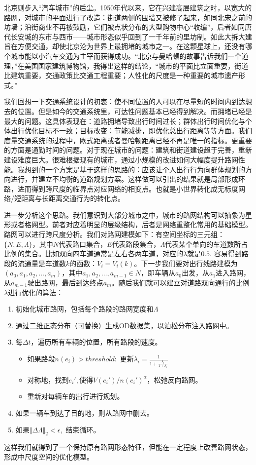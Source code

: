 北京则步入“汽车城市”的后尘。1950年代以来，它在兴建高层建筑之时，以宽大的路网，对城市的平面进行了改造：街道两侧的围墙又被修了起来，如同北宋之前的坊墙；沿街商业不再被鼓励，它们被点状分布的大型购物中心“收编”，后者如同唐代长安城的东市与西市——城市形态似乎回到了一千年前的里坊制。如此大拆大建旨在方便交通，却使北京沦为世界上最拥堵的城市之一。在这颗星球上，还没有哪个城市能以小汽车交通为主宰而获得成功。“北京与曼哈顿的故事告诉我们一个道理，”在美国国家建筑博物馆，我得出这样的结论，“城市的平面比立面重要，街道比建筑重要，交通政策比交通工程重要；人性化的尺度是一种重要的城市遗产形式。” 

我们回想一下交通系统设计的初衷：使不同位置的人可以在尽量短的时间内到达想去的位置。但是如今的交通系统里，可达性问题基本已经得到解决。而拥堵已经是最大的问题。这具体表现在：道路拥堵导致出行时间过长；群体出行时间优化与个体出行优化目标不一致；目标改变：节能减排，即优化总出行距离等等方面。我们度量交通系统的过程中，欧式距离或者曼哈顿距离已经不再是唯一的指标。更重要的方面是通勤时间的问题。对于现在城市的问题：建筑和街道建设趋于完善，重新建设难度巨大。很难根据现有的城市，通过小规模的改进如何大幅度提升路网性能。我想到的一个方案是基于这样的思路的：应该让个人出行行为向群体规划的方向进行，并建立不均衡的道路规划方案。这样做可以引出的结果就是局部形成环路，进而得到跨尺度的临界点对应网络的相变点。也就是小世界转化成无标度网络/短距离与长距离交通行为的转化点。

进一步分析这个思路。我们意识到大部分城市之中，城市的路网结构可以抽象为星形或者格网型。前者对应着明显的层级结构，后者是网络重整化常用的基础模型。路网可以进行跨尺度分析。我们对路网建模如下：有空间坐标的三元组：$\{N,E,\Lambda\}$，其中$N$代表路口集合，$E$代表路段集合，$\Lambda$代表某个单向的车道数所占比例的集合。比如双向四车道通常是左右各两车道，对应的$\lambda$就是$0.5$. 容易得到路段的流通量是车道数$k$的函数：$V_i = V_i(k)$。下一步我们要对出行线路建模为$(a_0,a_1,a_2,\dots,a_m)$，其中$a_1,a_2,\dots,a_{m-1}\in N$，即车辆从$a_0$出发，从$a_1$进入路网，从$a_{m-1}$驶出路网，最后到达终点$a_m$。随后我们就可以建立对道路双向通行的比例$\lambda$进行优化的算法：\begin{enumerate}
  \item 初始化城市路网，包括每个路段的路网宽度和$\Lambda$
  \item 通过二维正态分布（可替换）生成OD数据集，以泊松分布注入路网中。
  \item 每$\Delta t$，遍历所有车辆的位置，所有路段的速度。
  \begin{itemize}
      \item 如果路段$n(e_i)>threshold: $  更新$\lambda_i = \frac{1}{1+\frac{\lambda_i}{1+\lambda_i}}$
      \item 对称地，找到$e_i',$使得$V(e_i')/n(e_i')^\alpha$，松弛反向路网。
      \item 重新对每辆车的出行进行规划。
  \end{itemize}
  \item 如果一辆车到达了目的地，则从路网中删去。
  \item 如果$\Vert \Delta\Lambda\Vert_2<\epsilon,$ 结束循环。
\end{enumerate}
这样我们就得到了一个保持原有路网形态特征，但能在一定程度上改善路网状态，形成中尺度空间的优化模型。


